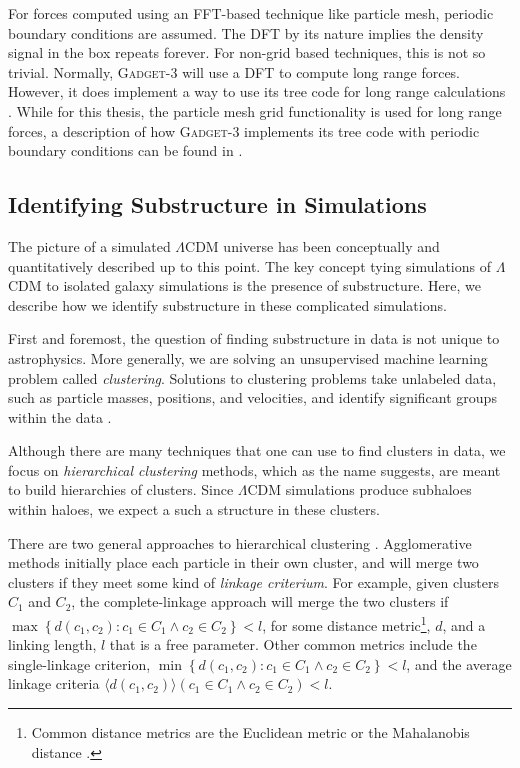 For forces computed using an FFT-based technique like particle mesh, periodic boundary conditions are assumed. The DFT by its nature implies the density signal in the box repeats forever. For non-grid based techniques, this is not so trivial. Normally, \textsc{Gadget-3} will use a DFT to compute long range forces. However, it does implement a way to use its tree code for long range calculations \citep{GadgetCodePaper}. While for this thesis, the particle mesh grid functionality is used for long range forces, a description of how \textsc{Gadget-3} implements its tree code with periodic boundary conditions can be found in \citet{hernquist_1991}.

\subsection{Identifying Substructure in Simulations}


The picture of a simulated $\Lambda$CDM universe has been conceptually and quantitatively described up to this point. The key concept tying simulations of $\Lambda$CDM to isolated galaxy simulations is the presence of substructure. Here, we describe how we identify substructure in these complicated simulations. 

First and foremost, the question of finding substructure in data is not unique to astrophysics. More generally, we are solving an unsupervised machine learning problem called \textit{clustering}. Solutions to clustering problems take unlabeled data, such as particle masses, positions, and velocities, and identify significant groups within the data \citep{statistical_learning_r}. 

Although there are many techniques that one can use to find clusters in data, we focus on \textit{hierarchical clustering} methods, which as the name suggests, are meant to build hierarchies of clusters. Since $\Lambda$CDM simulations produce subhaloes within haloes, we expect a such a structure in these clusters.

There are two general approaches to hierarchical clustering \citep{statistical_learning_r}. Agglomerative methods initially place each particle in their own cluster, and will merge two clusters if they meet some kind of \textit{linkage criterium}. For example, given clusters $C_1$ and $C_2$, the complete-linkage approach will merge the two clusters if $\max\left\{ d(c_1, c_2) : c_1 \in C_1 \wedge c_2 \in C_2\right\} < l$, for some distance metric\footnote{Common distance metrics are the Euclidean metric or the Mahalanobis distance \citep{statistical_learning_r}.}, $d$,  and a linking length, $l$ that is a free parameter. Other common metrics include the single-linkage criterion, $\min\left\{ d(c_1, c_2) : c_1 \in C_1 \wedge c_2 \in C_2\right\} < l$, and the average linkage criteria $\langle d(c_1,c_2) \rangle \left (c_1 \in C_1 \wedge c_2 \in C_2\right) < l$.


